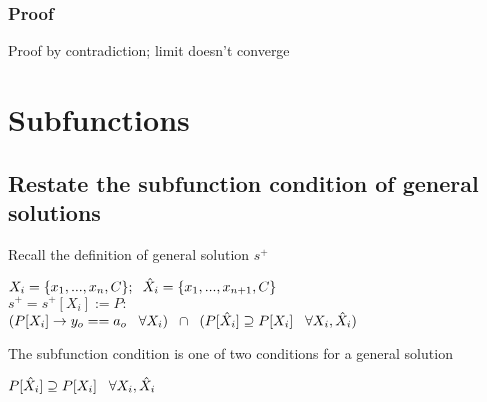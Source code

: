 \documentclass[11pt]{article}
\begin{document}
\subsubsection{Proof}
Proof by contradiction; limit doesn't converge

















\newpage
\section{Subfunctions}





\subsection{Restate the subfunction condition of general solutions}
Recall the definition of general solution $s^+$
\begin{center}
$
X_i = \{x_1,...,x_n,C\}; \hspace{2mm} \hat{X}_i = \{x_1,...,x_{n+1},C\}
$
\\ \vspace{2mm}
$
s^+ = s^+[X_i] := P :
$
\\ \vspace{2mm}
$
(P \lbrack X_i \rbrack \rightarrow y_{o} == a_{o} \hspace{3mm} \forall X_i) \hspace{2mm} \cap \hspace{2mm} (P[\hat{X}_i] \supseteq P[X_i] \hspace{3mm} \forall X_i,\hat{X}_i)
$
\end{center}
\vspace{3mm}
The subfunction condition is one of two conditions for a general solution
\begin{center}
$
P[\hat{X}_i] \supseteq P[X_i] \hspace{3mm} \forall X_i,\hat{X}_i
$
\end{center}
\end{document}
